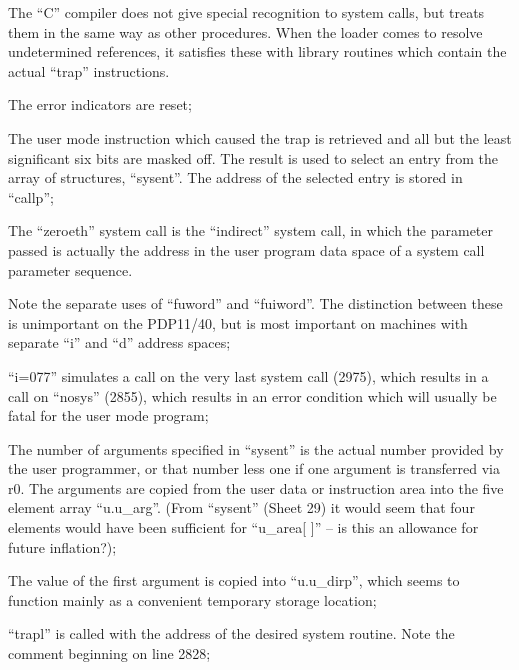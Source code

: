 The ``C'' compiler does not give special
recognition to system calls, but treats
them in the same way as other procedures. When the loader comes to
resolve undetermined references, it
satisfies these with library routines
which contain the actual ``trap''
instructions.

\bd
\item[2752:] The error indicators are reset;

\item[2754:] The user mode instruction which
 caused the trap is retrieved and
 all but the least significant six
 bits are masked off. The result
 is used to select an entry from
 the array of structures,
``sysent''. The address of the
selected entry is stored in
``callp'';


\item[2755:] The ``zeroeth'' system call is the
``indirect'' system call, in which
the parameter passed is actually
the address in the user program
data space of a system call
parameter sequence.
\ed

Note the separate uses of ``fuword'' and
``fuiword''. The distinction between
these is unimportant on the PDP11/40,
but is most important on machines with
separate ``i'' and ``d'' address spaces;

\bd
\item[2760:] ``i=077'' simulates a call on the
very last system call (2975),
which results in a call on
``nosys'' (2855), which results in
an error condition which will
usually be fatal for the user
mode program;

\item[2762:]
\item[2765:] The number of arguments specified
in ``sysent'' is the actual number
provided by the user programmer,
or that number less one if one
argument is transferred via r0.
The arguments are copied from the
user data or instruction area
into the five element array
``u.u\_arg''. (From ``sysent'' (Sheet
29) it would seem that four elements would have been sufficient
for ``u\_area[ ]'' -- is this an
allowance for future inflation?);

\item[2770:] The value of the first argument
is copied into ``u.u\_dirp'', which
seems to function mainly as a
convenient temporary storage
location;

\item[2771:] ``trapl'' is called with the
 address of the desired system
 routine. Note the comment beginning on line 2828;

